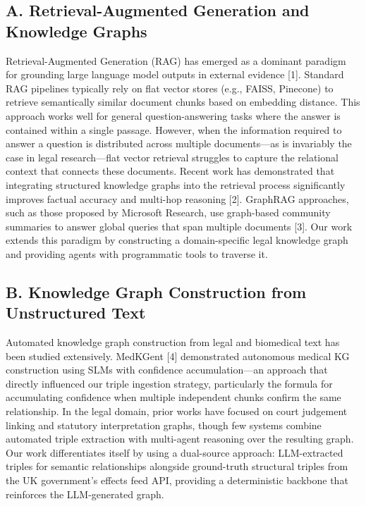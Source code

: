 \documentclass[10pt, a4paper, twocolumn]{article}
\begin{document}
\subsection{A. Retrieval-Augmented Generation and Knowledge Graphs}
Retrieval-Augmented Generation (RAG) has emerged as a dominant paradigm for grounding large language model outputs in external evidence [1]. Standard RAG pipelines typically rely on flat vector stores (e.g., FAISS, Pinecone) to retrieve semantically similar document chunks based on embedding distance. This approach works well for general question-answering tasks where the answer is contained within a single passage. However, when the information required to answer a question is distributed across multiple documents—as is invariably the case in legal research—flat vector retrieval struggles to capture the relational context that connects these documents. Recent work has demonstrated that integrating structured knowledge graphs into the retrieval process significantly improves factual accuracy and multi-hop reasoning [2]. GraphRAG approaches, such as those proposed by Microsoft Research, use graph-based community summaries to answer global queries that span multiple documents [3]. Our work extends this paradigm by constructing a domain-specific legal knowledge graph and providing agents with programmatic tools to traverse it.

\subsection{B. Knowledge Graph Construction from Unstructured Text}
Automated knowledge graph construction from legal and biomedical text has been studied extensively. MedKGent [4] demonstrated autonomous medical KG construction using SLMs with confidence accumulation—an approach that directly influenced our triple ingestion strategy, particularly the formula for accumulating confidence when multiple independent chunks confirm the same relationship. In the legal domain, prior works have focused on court judgement linking and statutory interpretation graphs, though few systems combine automated triple extraction with multi-agent reasoning over the resulting graph. Our work differentiates itself by using a dual-source approach: LLM-extracted triples for semantic relationships alongside ground-truth structural triples from the UK government's effects feed API, providing a deterministic backbone that reinforces the LLM-generated graph.
\end{document}
